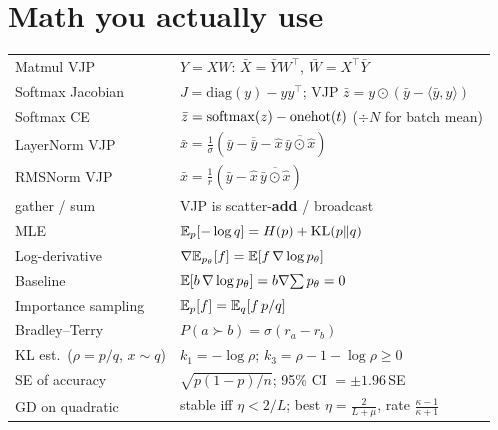 \section{Math you actually use}

\begin{mem}[Identities]
\begin{tabularx}{\linewidth}{@{}lL@{}}
\toprule
Matmul VJP & $Y{=}XW$: $\bar X=\bar Y W^\top$, $\bar W = X^\top\bar Y$\\
Softmax Jacobian & $J=\mathrm{diag}(y)-yy^\top$; VJP $\bar z = y\odot(\bar y-\langle\bar y,y\rangle)$\\
Softmax CE & $\bar z=\mathrm{softmax}(z)-\mathrm{onehot}(t)$ \;($\div$$N$ for batch mean)\\
LayerNorm VJP & $\bar x=\frac1\sigma(\bar y-\overline{\bar y}-\hat x\,\overline{\bar y\odot\hat x})$\\
RMSNorm VJP & $\bar x=\frac1r(\bar y-\hat x\,\overline{\bar y\odot\hat x})$\\
gather / sum & VJP is scatter-\textbf{add} / broadcast\\
MLE & $\mathbb{E}_p[-\log q]=H(p)+\mathrm{KL}(p\|q)$\\
Log-derivative & $\nabla\mathbb{E}_{p_\theta}[f]=\mathbb{E}[f\,\nabla\log p_\theta]$\\
Baseline & $\mathbb{E}[b\,\nabla\log p_\theta]=b\nabla\!\sum p_\theta=0$\\
Importance sampling & $\mathbb{E}_p[f]=\mathbb{E}_q[f\,p/q]$\\
Bradley--Terry & $P(a\succ b)=\sigma(r_a-r_b)$\\
KL est.\ ($\rho{=}p/q$, $x{\sim}q$) & $k_1=-\log\rho$; $k_3=\rho-1-\log\rho\ge0$\\
SE of accuracy & $\sqrt{p(1-p)/n}$; 95\% CI $=\pm1.96\,$SE\\
GD on quadratic & stable iff $\eta<2/L$; best $\eta=\frac{2}{L+\mu}$, rate $\frac{\kappa-1}{\kappa+1}$\\
\bottomrule
\end{tabularx}
\end{mem}

